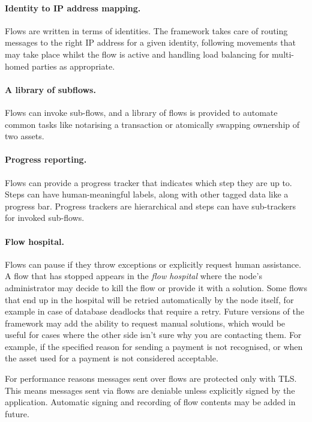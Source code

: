 \documentclass{article}
\begin{document}
\paragraph{Identity to IP address mapping.}Flows are written in terms of identities. The framework takes care of
routing messages to the right IP address for a given identity, following movements that may take place whilst the
flow is active and handling load balancing for multi-homed parties as appropriate.

\paragraph{A library of subflows.}Flows can invoke sub-flows, and a library of flows is provided to automate common
tasks like notarising a transaction or atomically swapping ownership of two assets.

\paragraph{Progress reporting.}Flows can provide a progress tracker that indicates which step they are up to. Steps
can have human-meaningful labels, along with other tagged data like a progress bar. Progress trackers are
hierarchical and steps can have sub-trackers for invoked sub-flows.

\paragraph{Flow hospital.}Flows can pause if they throw exceptions or explicitly request human assistance. A flow
that has stopped appears in the \emph{flow hospital} where the node's administrator may decide to kill the flow or
provide it with a solution. Some flows that end up in the hospital will be retried automatically by the node
itself, for example in case of database deadlocks that require a retry. Future versions of the framework may add
the ability to request manual solutions, which would be useful for cases where the other side isn't sure why 
you are contacting them. For example, if the specified reason for sending a payment is not recognised, or 
when the asset used for a payment is not considered acceptable.

For performance reasons messages sent over flows are protected only with TLS. This means messages sent via flows
are deniable unless explicitly signed by the application. Automatic signing and recording of flow contents may be
added in future.
\end{document}

